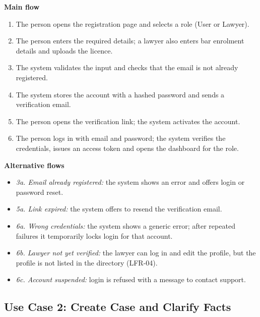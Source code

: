\textbf{Main flow}

\begin{enumerate}
  \item The person opens the registration page and selects a role (User or Lawyer).
  \item The person enters the required details; a lawyer also enters bar enrolment details and uploads the licence.
  \item The system validates the input and checks that the email is not already registered.
  \item The system stores the account with a hashed password and sends a verification email.
  \item The person opens the verification link; the system activates the account.
  \item The person logs in with email and password; the system verifies the credentials, issues an access token and opens the dashboard for the role.
\end{enumerate}

\textbf{Alternative flows}

\begin{itemize}
  \item \emph{3a. Email already registered:} the system shows an error and offers login or password reset.
  \item \emph{5a. Link expired:} the system offers to resend the verification email.
  \item \emph{6a. Wrong credentials:} the system shows a generic error; after repeated failures it temporarily locks login for that account.
  \item \emph{6b. Lawyer not yet verified:} the lawyer can log in and edit the profile, but the profile is not listed in the directory (LFR-04).
  \item \emph{6c. Account suspended:} login is refused with a message to contact support.
\end{itemize}

\subsection{Use Case 2: Create Case and Clarify Facts}

